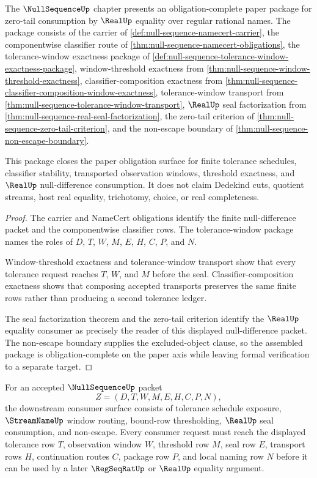 \begin{theorem}
\label{thm:null-sequence-obligation-closure-package}
The $\NullSequenceUp$ chapter presents an obligation-complete paper package for zero-tail consumption by $\RealUp$ equality over regular rational names. The package consists of the carrier of \autoref{def:null-sequence-namecert-carrier}, the componentwise classifier route of \autoref{thm:null-sequence-namecert-obligations}, the tolerance-window exactness package of \autoref{def:null-sequence-tolerance-window-exactness-package}, window-threshold exactness from \autoref{thm:null-sequence-window-threshold-exactness}, classifier-composition exactness from \autoref{thm:null-sequence-classifier-composition-window-exactness}, tolerance-window transport from \autoref{thm:null-sequence-tolerance-window-transport}, $\RealUp$ seal factorization from \autoref{thm:null-sequence-real-seal-factorization}, the zero-tail criterion of \autoref{thm:null-sequence-zero-tail-criterion}, and the non-escape boundary of \autoref{thm:null-sequence-non-escape-boundary}.

This package closes the paper obligation surface for finite tolerance schedules, classifier stability, transported observation windows, threshold exactness, and $\RealUp$ null-difference consumption. It does not claim Dedekind cuts, quotient streams, host real equality, trichotomy, choice, or real completeness.
\end{theorem}
\begin{proof}
The carrier and NameCert obligations identify the finite null-difference packet and the componentwise classifier rows. The tolerance-window package names the roles of $D$, $T$, $W$, $M$, $E$, $H$, $C$, $P$, and $N$.

Window-threshold exactness and tolerance-window transport show that every tolerance request reaches $T$, $W$, and $M$ before the seal. Classifier-composition exactness shows that composing accepted transports preserves the same finite rows rather than producing a second tolerance ledger.

The seal factorization theorem and the zero-tail criterion identify the $\RealUp$ equality consumer as precisely the reader of this displayed null-difference packet. The non-escape boundary supplies the excluded-object clause, so the assembled package is obligation-complete on the paper axis while leaving formal verification to a separate target.
\end{proof}

\begin{definition}
\label{def:null-sequence-root-unblock-consumer-surface}
For an accepted $\NullSequenceUp$ packet
$$
Z=(D,T,W,M,E,H,C,P,N),
$$
the downstream consumer surface consists of tolerance schedule exposure, $\StreamNameUp$ window routing, bound-row thresholding, $\RealUp$ seal consumption, and non-escape. Every consumer request must reach the displayed tolerance row $T$, observation window $W$, threshold row $M$, seal row $E$, transport rows $H$, continuation routes $C$, package row $P$, and local naming row $N$ before it can be used by a later $\RegSeqRatUp$ or $\RealUp$ equality argument.
\end{definition}

